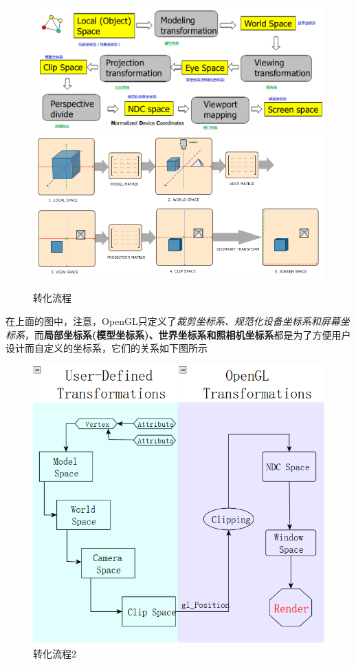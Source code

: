 \documentclass[UTF8,a4paper,12pt]{ctexbook}
\begin{document}
		\begin{figure}[H]
			\centering
			\includegraphics[width=.95\linewidth]{transferAll.png}
			\includegraphics[width=.93\linewidth]{transferAll3.png}
			\caption{转化流程}
		\end{figure}
		
		在上面的图中，注意，OpenGL只定义了\textit{裁剪坐标系、规范化设备坐标系和屏幕坐标系}，而\textbf{局部坐标系(模型坐标系)、世界坐标系和照相机坐标系}都是为了方便用户设计而自定义的坐标系，它们的关系如下图所示
		
		\begin{figure}[H]
			\centering
			\includegraphics[scale = 0.9]{transferAll2.png}
			\caption{转化流程2}
		\end{figure}
		
\end{document}
